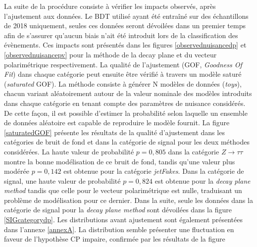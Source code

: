 La suite de la procédure consiste à vérifier les impacts observés, après l'ajustement aux données. Le BDT utilisé ayant été entraîné sur des échantillons de 2018 uniquement, seules ces données seront dévoilées dans un premier temps afin de s'assurer qu'aucun biais n'ait été introduit lors de la classification des évènements. Ces impacts sont présentés dans les figures \ref{observednuisancedp} et \ref{observednuisancepv} pour la méthode de la decay plane et du vecteur polarimétrique respectivement. La qualité de l'ajustement (GOF, \textit{Goodness Of Fit}) dans chaque catégorie peut ensuite être vérifié à travers un modèle saturé (\textit{saturated} GOF). La méthode consiste à générer N modèles de données (\textit{toys}), chacun variant aléatoirement autour de la valeur nominale des modèles introduits dans chaque catégorie en tenant compte des paramètres de nuisance considérés. De cette façon, il est possible d'estimer la probabilité selon laquelle un ensemble de données aléatoire est capable de reproduire le modèle fournit. La figure \ref{saturatedGOF} présente les résultats de la qualité d'ajustement dans les catégories de bruit de fond et dans la catégorie de signal pour les deux méthodes considérées. La haute valeur de probabilité $p=0,805$ dans la catégorie $Z\to\tau\tau$ montre la bonne modélisation de ce bruit de fond, tandis qu'une valeur plus modérée $p=0,142$ est obtenue pour la catégorie \textit{jetFakes}. Dans la catégorie de signal, une haute valeur de probabilité $p=0,824$ est obtenue pour la \textit{decay plane method} tandis que celle pour le vecteur polarimétrique est nulle, traduisant un problème de modélisation pour ce dernier. Dans la suite, seule les données dans la catégorie de signal pour la \textit{decay plane method} sont dévoilées dans la figure \ref{SIGcategorydp}. Les distributions avant ajustement sont également présentées dans l'annexe \ref{annexA}. La distribution semble présenter une fluctuation en faveur de l'hypothèse CP impaire, confirmée par les résultats de la figure  \\

